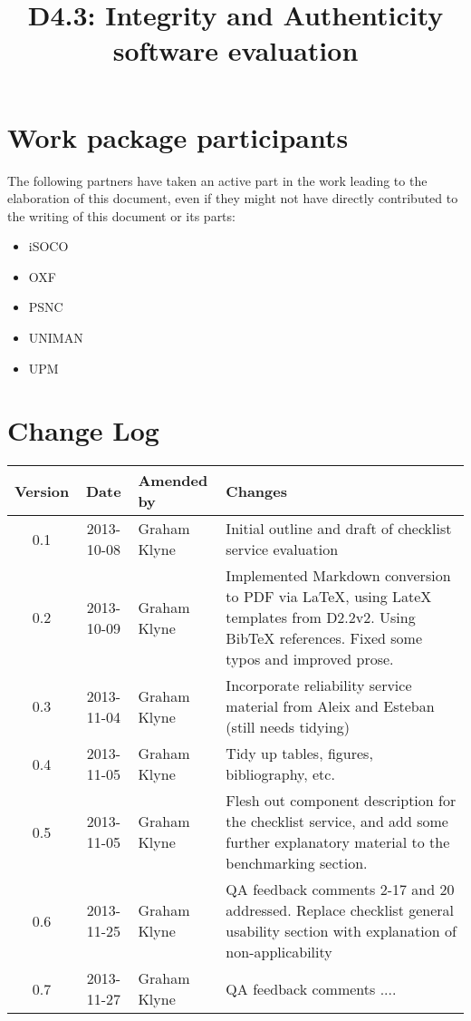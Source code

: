 \documentclass[a4paper, twoside, 11pt]{article}
\title{D4.3: Integrity and Authenticity software evaluation}
\begin{document}
\maketitle

\section*{Work package participants} The following partners have taken an active part in the work leading to the elaboration of this document, even if they might not have directly contributed to the writing of this document or its parts: %
\begin{itemize}
\item iSOCO
\item OXF
\item PSNC
\item UNIMAN
\item UPM
\end{itemize}

\section*{Change Log}
\begin{centering}

\begin{tabular}{|c|c|p{4.92cm}|p{6.5cm}|}

\hline \textbf{Version} & \textbf{Date} & \textbf{Amended by} & \textbf{Changes} \\ \hline
0.1 & 2013-10-08 & Graham Klyne & Initial outline and draft of checklist service evaluation \\ \hline
0.2 & 2013-10-09 & Graham Klyne & Implemented Markdown conversion to PDF via LaTeX, using LateX templates from D2.2v2.  Using BibTeX references.  Fixed some typos and improved prose. \\ \hline
0.3 & 2013-11-04 & Graham Klyne & Incorporate reliability service material from Aleix and Esteban (still needs tidying) \\ \hline
0.4 & 2013-11-05 & Graham Klyne & Tidy up tables, figures, bibliography, etc. \\ \hline
0.5 & 2013-11-05 & Graham Klyne & Flesh out component description for the checklist service, and add some further explanatory material to the benchmarking section. \\ \hline
0.6 & 2013-11-25 & Graham Klyne & QA feedback comments 2-17 and 20 addressed.
Replace checklist general usability section with explanation of non-applicability
\\ \hline
0.7 & 2013-11-27 & Graham Klyne & QA feedback comments ....
\\ \hline



\end{tabular}

\end{centering}
\clearpage
\end{document}

